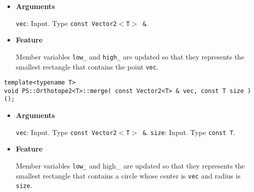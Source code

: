 \begin{itemize}

\item{{\bf Arguments}}

\texttt{vec}: Input. Type \texttt{const Vector2$<$T$>$ \&}.

\item{{\bf Feature}}

Member variables \texttt{low\_} and \texttt{high\_} are updated so that they represents the smallest rectangle that contains the point \texttt{vec}.

\end{itemize}
\begin{screen}
\begin{verbatim}
template<typename T>
void PS::Orthotope2<T>::merge( const Vector2<T> & vec, const T size )();
\end{verbatim}
\end{screen}

\begin{itemize}

\item{{\bf Arguments}}

\texttt{vec}: Input. Type \texttt{const Vector2$<$T$>$ \&}.
\texttt{size}: Input. Type \texttt{const T}.

\item{{\bf Feature}}

Member variables \texttt{low\_} and {high\_} are updated so that they represents the smallest rectangle that contains a circle whose center is \texttt{vec} and radius is \texttt{size}.

\end{itemize}

